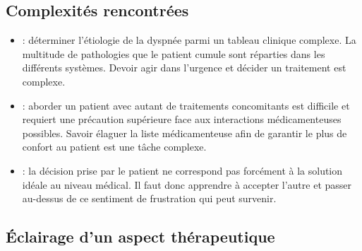 \leavevmode{}\label{retour:examens_cas_v}

\subsection{Complexités rencontrées}
\begin{itemize}[label=\textbullet]
    \item {} : déterminer l’étiologie de la dyspnée parmi un tableau clinique complexe. La multitude de pathologies que le patient cumule sont réparties dans les différents systèmes. Devoir agir dans l’urgence et décider un traitement est complexe.
    \item {} : aborder un patient avec autant de traitements concomitants est difficile et requiert une précaution supérieure face aux interactions médicamenteuses possibles. Savoir élaguer la liste médicamenteuse afin de garantir le plus de confort au patient est une tâche complexe.
    \item {} : la décision prise par le patient ne correspond pas forcément à la solution idéale au niveau médical. Il faut donc apprendre à accepter l’autre et passer au-dessus de ce sentiment de frustration qui peut survenir.
    \end{itemize}
\subsection{Éclairage d’un aspect thérapeutique}
